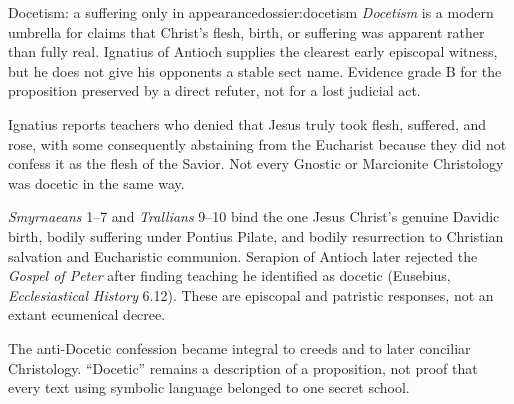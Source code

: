 \begin{heresydossier}{Docetism: a suffering only in appearance}{dossier:docetism}
\objectfield \emph{Docetism} is a modern umbrella for claims that Christ's flesh, birth, or suffering was apparent rather than fully real. Ignatius of Antioch supplies the clearest early episcopal witness, but he does not give his opponents a stable sect name. Evidence grade B for the proposition preserved by a direct refuter, not for a lost judicial act.

\propositionfield Ignatius reports teachers who denied that Jesus truly took flesh, suffered, and rose, with some consequently abstaining from the Eucharist because they did not confess it as the flesh of the Savior. Not every Gnostic or Marcionite Christology was docetic in the same way.

\responsefield \emph{Smyrnaeans} 1--7 and \emph{Trallians} 9--10 bind the one Jesus Christ's genuine Davidic birth, bodily suffering under Pontius Pilate, and bodily resurrection to Christian salvation and Eucharistic communion. Serapion of Antioch later rejected the \emph{Gospel of Peter} after finding teaching he identified as docetic (Eusebius, \emph{Ecclesiastical History} 6.12). These are episcopal and patristic responses, not an extant ecumenical decree.

\aftermathfield The anti-Docetic confession became integral to creeds and to later conciliar Christology. ``Docetic'' remains a description of a proposition, not proof that every text using symbolic language belonged to one secret school.
\end{heresydossier}

